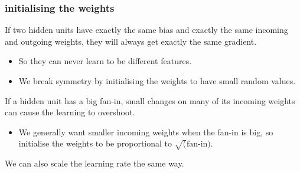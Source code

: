 \documentclass[USenglish,pdftex,compress,10pt,svgnamesi,handout]{beamer}
\begin{document}
%
%
%










\begin{frame}
\frametitle{initialising the weights}
If two hidden units have exactly the same bias and exactly the same incoming and outgoing weights, they will always get exactly the same gradient.
\begin{itemize}
\item  So they can never learn to be different features.
\item  We break symmetry by initialising the weights to have small random values.
\end{itemize}
If a hidden unit has a big fan-in, small changes on many of its incoming weights can cause the learning to overshoot.
\begin{itemize}
\item  We generally want smaller incoming weights when the fan-in is big, so initialise the weights to be proportional to $\sqrt(\textrm{fan-in})$.
\end{itemize}
We can also scale the learning rate the same way.
\end{frame}
\end{document}
